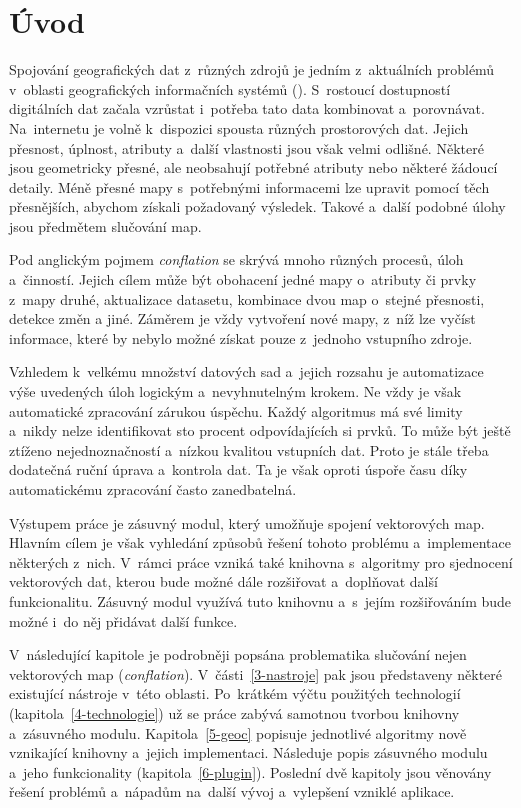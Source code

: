 \chapter{Úvod}
\label{1-uvod}

Spojování geografických dat z~různých zdrojů je jedním z~aktuálních
problémů v~oblasti geografických informačních systémů (). 
S~rostoucí dostupností di\-gitálních dat začala vzrůstat i~potřeba 
tato data kombinovat a~porovnávat. Na~internetu je volně k~dispozici 
spousta různých prostorových dat. Jejich přes\-nost, úplnost, 
atributy a~další vlastnosti jsou však velmi odlišné. Některé jsou 
geo\-metricky přesné, ale neobsahují potřebné atributy nebo některé 
žádoucí detaily. Méně přesné mapy s~potřebnými informacemi lze upravit 
pomocí těch přesnějších, abychom získali požadovaný výsledek. Takové
a~další podobné úlohy jsou předmětem slučování map.

Pod anglickým pojmem \textit{conflation} se skrývá mnoho různých
procesů, úloh a~činností. Jejich cílem může být obohacení jedné mapy 
o~atributy či prvky z~mapy druhé, aktualizace datasetu, kombinace 
dvou map o~stejné přesnosti, detekce změn a jiné. Záměrem je vždy 
vytvoření nové mapy, z~níž lze vyčíst informace, které by nebylo možné
získat pouze z~jednoho vstupního zdroje.

Vzhledem k~velkému množství datových sad a~jejich rozsahu je automatizace
výše uvedených úloh logickým a~nevyhnutelným krokem. Ne vždy je však
automatické zpracování zárukou úspěchu. Každý algoritmus má své limity
a~nikdy nelze identifi\-kovat sto procent odpovídajících si prvků. To může
být ještě ztíženo nejednoznač\-ností a~nízkou kvalitou vstupních dat. Proto 
je stále třeba dodatečná ruční úprava a~kontrola dat. Ta je však oproti 
úspoře času díky automatickému zpra\-co\-vání často za\-ne\-dbatelná.

Výstupem práce je zásuvný modul, který umožňuje spojení vektorových 
map. Hlavním cílem je však vyhledání způsobů řešení tohoto problému 
a~implementace některých z~nich. V~rámci práce vzniká také knihovna 
s~algoritmy pro sjednocení vektorových dat, kterou bude možné dále 
rozšiřovat a~doplňovat další funkcionalitu. Zásuvný modul využívá 
tuto knihovnu a~s~jejím rozšiřováním bude možné i~do něj přidávat další 
funkce.   

V~následující kapitole je podrobněji popsána problematika slučování 
nejen vektorových map (\textit{conflation}). V~části~\ref{3-nastroje} 
pak jsou představeny některé existující nástroje v~této oblasti. 
Po~krátkém výčtu použitých technologií (kapitola~\ref{4-technologie})
už se práce zabývá samotnou tvorbou knihovny a~zásuvného modulu. 
Kapitola~\ref{5-geoc} popisuje jednotlivé algoritmy nově vznikající
knihovny a~jejich implementaci. Následuje popis zásuvného modulu 
a~jeho funkcionality (kapitola~\ref{6-plugin}). Poslední dvě kapitoly 
jsou věnovány řešení problémů a~nápadům na~další vývoj a~vylepšení 
vzniklé aplikace.  

